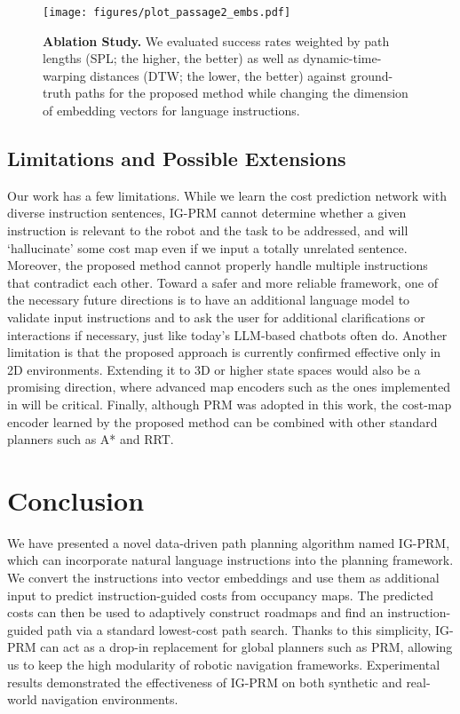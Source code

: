 \begin{figure}[t]
    \centering
    \texttt{[image: figures/plot\_passage2\_embs.pdf]}
    \caption{\textbf{Ablation Study.} We evaluated success rates weighted by path lengths (SPL; the higher, the better) as well as dynamic-time-warping distances (DTW; the lower, the better) against ground-truth paths for the proposed method while changing the dimension of embedding vectors for language instructions.}
    \label{fig:plot_passage2_embs}
\end{figure}

\subsection{Limitations and Possible Extensions}
Our work has a few limitations. While we learn the cost prediction network with diverse instruction sentences, IG-PRM cannot determine whether a given instruction is relevant to the robot and the task to be addressed, and will `hallucinate' some cost map even if we input a totally unrelated sentence. Moreover, the proposed method cannot properly handle multiple instructions that contradict each other. Toward a safer and more reliable framework, one of the necessary future directions is to have an additional language model to validate input instructions and to ask the user for additional clarifications or interactions if necessary, just like today's LLM-based chatbots often do. Another limitation is that the proposed approach is currently confirmed effective only in 2D environments. Extending it to 3D or higher state spaces would also be a promising direction, where advanced map encoders such as the ones implemented in \cite{ichter2020learned} will be critical. Finally, although PRM was adopted in this work, the cost-map encoder learned by the proposed method can be combined with other standard planners such as A* and RRT.

\section{Conclusion}
We have presented a novel data-driven path planning algorithm named IG-PRM, which can incorporate natural language instructions into the planning framework. We convert the instructions into vector embeddings and use them as additional input to predict instruction-guided costs from occupancy maps. The predicted costs can then be used to adaptively construct roadmaps and find an instruction-guided path via a standard lowest-cost path search. Thanks to this simplicity, IG-PRM can act as a drop-in replacement for global planners such as PRM, allowing us to keep the high modularity of robotic navigation frameworks. Experimental results demonstrated the effectiveness of IG-PRM on both synthetic and real-world navigation environments.
